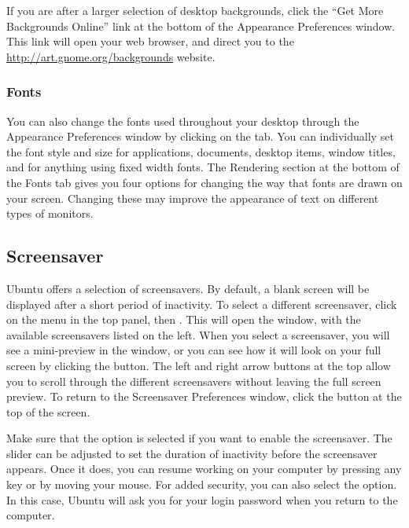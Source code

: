 If you are after a larger selection of desktop backgrounds, click the ``Get More Backgrounds Online'' link at the bottom of the Appearance Preferences window.  This link will open your web browser, and direct you
to the \url{http://art.gnome.org/backgrounds} website.

\subsubsection{Fonts}
You can also change the fonts used throughout your desktop through the Appearance Preferences window by clicking on the  tab. You can individually set the font style and size for applications, documents, desktop items, window titles, and for anything using fixed width fonts. The Rendering section at the bottom of the Fonts tab gives you four options for changing the way that fonts are drawn on your screen. Changing these may improve the appearance of text on different types of monitors.

\subsection{Screensaver}
Ubuntu offers a selection of screensavers.  By default, a blank screen will be displayed after a short period of inactivity. To select a different screensaver, click on the  menu in the top panel, then . This will open the  window, with the available screensavers listed on the left. When you select a screensaver, you will see a mini-preview in the window, or you can see how it will look on your full screen by clicking the  button. The left and right arrow buttons at the top allow you to scroll through the different screensavers without leaving the full screen preview. To return to the Screensaver Preferences window, click the  button at the top of the screen.

Make sure that the  option is selected if you want to enable the screensaver. The slider can be adjusted to set the duration of inactivity before the screensaver appears. Once it does, you can resume working on your computer by pressing any key or by moving your mouse. For added security, you can also select the  option. In this case, Ubuntu will ask you for your login password when you return to the computer.

